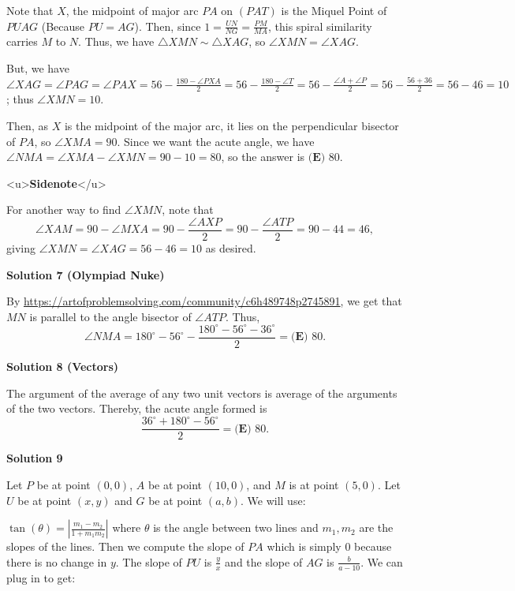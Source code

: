 \begin{enumerate}
Note that $X$, the midpoint of major arc $PA$ on $(PAT)$ is the Miquel Point of $PUAG$ (Because $PU = AG$). Then, since $1 = \frac{UN}{NG} = \frac{PM}{MA}$, this spiral similarity carries $M$ to $N$. Thus, we have $\triangle XMN \sim \triangle XAG$, so $\angle XMN = \angle XAG$. 

 But, we have $\angle XAG = \angle PAG = \angle PAX = 56 - \frac{180 - \angle PXA}{2} =56 - \frac{180 - \angle T}{2} = 56 - \frac{\angle A + \angle P}{2} = 56 - \frac{56+36}{2} = 56 - 46 = 10$; thus $\angle XMN = 10$. 

 Then, as $X$ is the midpoint of the major arc, it lies on the perpendicular bisector of $PA$, so $\angle XMA = 90$. Since we want the acute angle, we have $\angle NMA = \angle XMA - \angle XMN = 90 - 10 = 80$, so the answer is $\boxed{\textbf{(E) } 80}$.

 <u>\textbf{Sidenote}</u>

 For another way to find $\angle XMN$, note that 
 \[\angle XAM = 90 - \angle MXA = 90 - \frac{\angle AXP}{2} = 90 - \frac{\angle ATP}{2}= 90 - 44 = 46,\] giving $\angle XMN = \angle XAG = 56 - 46 = 10$ as desired.

 



\textbf{Solution 7 (Olympiad Nuke)}

By \href{https://artofproblemsolving.com/community/c6h489748p2745891}{https://artofproblemsolving.com/community/c6h489748p2745891}, we get that $MN$ is parallel to the angle bisector of $\angle ATP.$ Thus, 
 \[\angle NMA = 180^\circ - 56^\circ - \frac{180^\circ - 56^\circ - 36^\circ}{2} = \boxed{\textbf{(E) } 80}.\]




\textbf{Solution 8 (Vectors)}

The argument of the average of any two unit vectors is average of the arguments of the two vectors. Thereby, the acute angle formed is 
 \[\frac{36^\circ{} + 180^\circ{} - 56^\circ{}}{2} = \boxed{\textbf{(E) } 80}.\]




\textbf{Solution 9}

Let $P$ be at point $(0, 0)$, $A$ be at point $(10, 0)$, and $M$ is at point $(5, 0)$. Let $U$ be at point $(x, y)$ and $G$ be at point $(a, b)$. We will use:

 $\tan(\theta) = |\frac{m_1 - m_2}{1 + m_1m_2}|$ where $\theta$ is the angle between two lines and $m_1, m_2$ are the slopes of the lines. Then we compute the slope of $PA$ which is simply $0$ because there is no change in $y$. The slope of $PU$ is $\frac{y}{x}$ and the slope of $AG$ is $\frac{b}{a - 10}$. We can plug in to get:


\end{enumerate}
